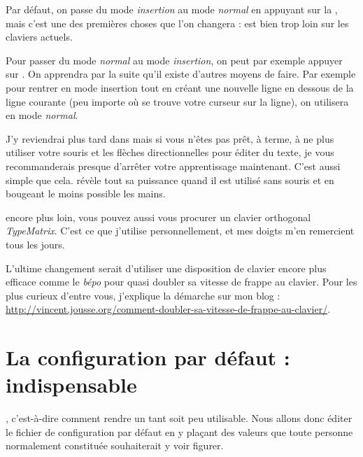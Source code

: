 Par défaut, on passe du mode \emph{insertion} au mode \emph{normal} en appuyant sur la \ttesc, mais c'est une des premières choses que l'on changera : \ttesc est bien trop loin sur les claviers actuels. 

Pour passer du mode \emph{normal} au mode \emph{insertion}, on peut par exemple appuyer sur \tti. On apprendra par la suite qu'il existe d'autres moyens de faire. Par exemple pour rentrer en mode insertion tout en créant une nouvelle ligne en dessous de la ligne courante (peu importe où se trouve votre curseur sur la ligne), on utilisera \tto en mode \emph{normal}.

J'y reviendrai plus tard dans \og {} \fg{} mais si vous n'êtes pas prêt, à terme, à ne plus utiliser votre souris et les flèches directionnelles pour éditer du texte, je vous recommanderais presque d'arrêter votre apprentissage maintenant. C'est aussi simple que cela. \vim révèle tout sa puissance quand il est utilisé sans souris et en bougeant le moins possible les mains.

 encore plus loin, vous pouvez aussi vous procurer un clavier orthogonal \emph{TypeMatrix}. C'est ce que j'utilise personnellement, et mes doigts m'en remercient tous les jours.

L'ultime changement serait d'utiliser une disposition de clavier encore plus efficace comme le \emph{bépo} pour quasi doubler sa vitesse de frappe au clavier. Pour les plus curieux d'entre vous, j'explique la démarche sur mon blog : \url{http://vincent.jousse.org/comment-doubler-sa-vitesse-de-frappe-au-clavier/}.


\newpage
\section{La configuration par défaut : indispensable}

, c'est-à-dire comment rendre \vim un tant soit peu utilisable. Nous allons donc éditer le fichier de configuration par défaut \vimrc{} en y plaçant des valeurs que toute personne normalement constituée souhaiterait y voir figurer.

